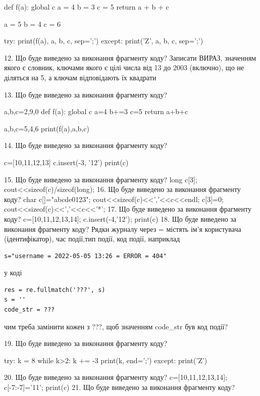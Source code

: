 \documentclass[11pt]{article}
\begin{document}
def f(a):
global c    a = 4
    b = 3
    c = 5
    return a + b + c

a = 5
b = 4
c = 6

try:
    print(f(a), a, b, c, sep=';')
except:
    print('Z', a, b, c, sep=';')

12. Що буде виведено за виконання фрагменту коду?
Записати ВИРАЗ, значенням якого є словник, ключами якого є цілі числа від 13 до 2003 (включно), що не діляться на 5, а ключам відповідають їх квадрати 

13. Що буде виведено за виконання фрагменту коду?

a,b,c=2,9,0
def f(a):
global c    a=4
    b+=3
    c=5
    return a+b+c

a,b,c=5,4,6
print(f(a),a,b,c)

14. Що буде виведено за виконання фрагменту коду?

c=[10,11,12,13]
c.insert(-3, '12')
print(c)


15. Що буде виведено за виконання фрагменту коду?
long c[3]; cout<<sizeof(c)/sizeof(long);
16. Що буде виведено за виконання фрагменту коду?
char c[]="abcde0123"; cout<<sizeof(c)<<','<<c<<endl;
   c[3]=0; cout<<sizeof(c)<<','<<c<<'*';
17. Що буде виведено за виконання фрагменту коду?
c=[10,11,12,13,14]; c.insert(-4,'12'); print(c)
18. Що буде виведено за виконання фрагменту коду?
Рядки журналу через = містять ім'я користувача (ідентифікатор), час події,тип події, код події, наприклад
\begin{verbatim}
s="username = 2022-05-05 13:26 = ERROR = 404"
\end{verbatim}
у коді 
\begin{verbatim}
res = re.fullmatch('???', s) 
s = ''
code_str = ??? 
\end{verbatim}
чим треба замінити кожен з ???, щоб значенням code\_str був код події? 



19. Що буде виведено за виконання фрагменту коду?

try:
    k = 8
    while k>2:
        k += -3
    print(k, end=';')
except:
    print('Z')


20. Що буде виведено за виконання фрагменту коду?
c=[10,11,12,13,14]; c[-7:-7]='11'; print(c)
21. Що буде виведено за виконання фрагменту коду?
\end{document}
